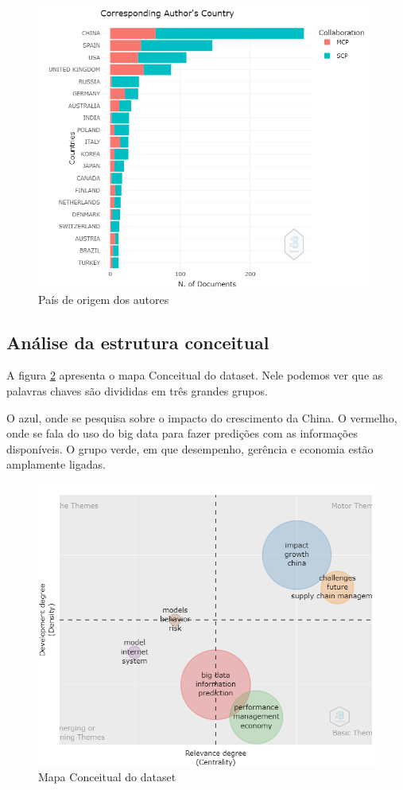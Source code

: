 \begin{figure}[ht]
    \centering
    \includegraphics[width=11cm]{experiments/Tong00020/PesquisaBibliometrica/Authors/MASSA@Tong00020-Corresponding Author's Country.png}
    \caption{País de origem dos autores}
    \label{fig:map-autor}
\end{figure}

\subsection{Análise da estrutura conceitual}

A figura \ref{fig:map-th} apresenta o mapa Conceitual do dataset. Nele podemos ver que as palavras chaves são divididas em três grandes grupos. 

O azul, onde se pesquisa sobre o impacto do crescimento da China. O vermelho, onde se fala do uso do big data para fazer predições com as informações disponíveis. O grupo verde, em que desempenho, gerência e economia estão amplamente ligadas.

\begin{figure}[ht]
    \centering
    \includegraphics[width=12cm]{experiments/Tong00020/PesquisaBibliometrica/Conceptual Structure/MASSA@Tong00020-Thematic Map.png}
    \caption{Mapa Conceitual do dataset}
    \label{fig:map-th}
\end{figure}



